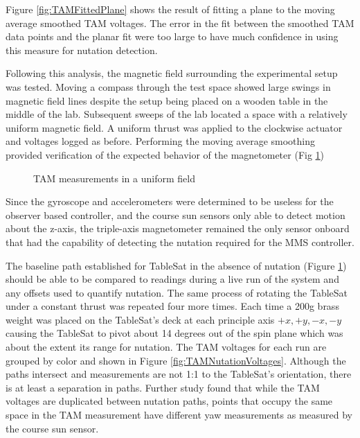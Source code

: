 Figure \ref{fig:TAMFittedPlane} shows the result of fitting a plane to the moving average smoothed TAM voltages.  The error in the fit between the smoothed TAM data points and the planar fit were too large to have much confidence in using this measure for nutation detection.

Following this analysis, the magnetic field surrounding the experimental setup was tested.  Moving a compass through the test space showed large swings in magnetic field lines despite the setup being placed on a wooden table in the middle of the lab.  Subsequent sweeps of the lab located a space with a relatively uniform magnetic field.  A uniform thrust was applied to the clockwise actuator and voltages logged as before.  Performing the moving average smoothing provided verification of the expected behavior of the magnetometer (Fig \ref{fig:TAMUniformField})

\begin{figure}[H]
  \centerline{}
  \caption{TAM measurements in a uniform field}
  \label{fig:TAMUniformField}
\end{figure}

Since the gyroscope and accelerometers were determined to be useless for the observer based controller, and the course sun sensors only able to detect motion about the z-axis, the triple-axis magnetometer remained the only sensor onboard that had the capability of detecting the nutation required for the MMS controller.

The baseline path established for TableSat in the absence of nutation (Figure \ref{fig:TAMUniformField}) should be able to be compared to readings during a live run of the system and any offsets used to quantify nutation.  The same process of rotating the TableSat under a constant thrust was repeated four more times.  Each time a 200g brass weight was placed on the TableSat's deck at each principle axis $+x, +y, -x, -y$ causing the TableSat to pivot about 14 degrees out of the spin plane which was about the extent its range for nutation.  The TAM voltages for each run are grouped by color and shown in Figure \ref{fig:TAMNutationVoltages}.  Although the paths intersect and measurements are not 1:1 to the TableSat's orientation, there is at least a separation in paths.  Further study found that while the TAM voltages are duplicated between nutation paths, points that occupy the same space in the TAM measurement have different yaw measurements as measured by the course sun sensor.

